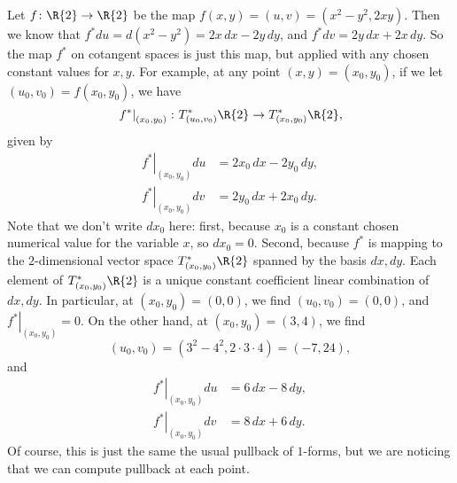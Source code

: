 \begin{example}
Let \(f \colon \R{2} \to \R{2}\) be the map \(f(x,y)=(u,v)=(x^2-y^2,2xy)\).
Then we know that \(f^* du = d(x^2-y^2)=2x \, dx - 2y \, dy\), and \(f^*dv = 2y \, dx + 2x \, dy\).
So the map \(f^*\) on cotangent spaces is just this map, but applied with any chosen constant values for \(x,y\).
For example, at any point \((x,y)=(x_0,y_0)\), if we let \((u_0,v_0)=f(x_0,y_0)\), we have
\[
\left.f^*\right|_{(x_0,y_0)} \colon T_{(u_0,v_0)}^* \R{2} \to T_{(x_0,y_0)}^* \R{2},
\]
given by
\begin{align*}
\left.f^*\right|_{(x_0,y_0)} du &= 2x_0 \, dx - 2y_0 \, dy, \\
\left.f^*\right|_{(x_0,y_0)} dv &= 2y_0 \, dx + 2x_0 \, dy.
\end{align*}
Note that we don't write \(dx_0\) here: first, because \(x_0\) is a constant chosen numerical value for the variable \(x\), so \(dx_0=0\). 
Second, because \(f^*\) is mapping to the \(2\)-dimensional vector space \(T^*_{(x_0,y_0)}\R{2}\) spanned by the basis \(dx,dy\).
Each element of \(T^*_{(x_0,y_0)}\R{2}\) is a unique constant coefficient linear combination of \(dx, dy\).
In particular, at \((x_0,y_0)=(0,0)\), we find \((u_0,v_0)=(0,0)\), and  \(\left.f^*\right|_{(x_0,y_0)}=0\).
On the other hand, at \((x_0,y_0)=(3,4)\), we find 
\[
(u_0,v_0)=(3^2-4^2,2 \cdot 3 \cdot 4)=(-7,24),
\]
and
\begin{align*}
\left.f^*\right|_{(x_0,y_0)} du &= 6 \, dx - 8 \, dy, \\
\left.f^*\right|_{(x_0,y_0)} dv &= 8 \, dx + 6 \, dy.
\end{align*}
Of course, this is just the same the usual pullback of \(1\)-forms, but we are noticing that we can compute pullback at each point.
\end{example}



